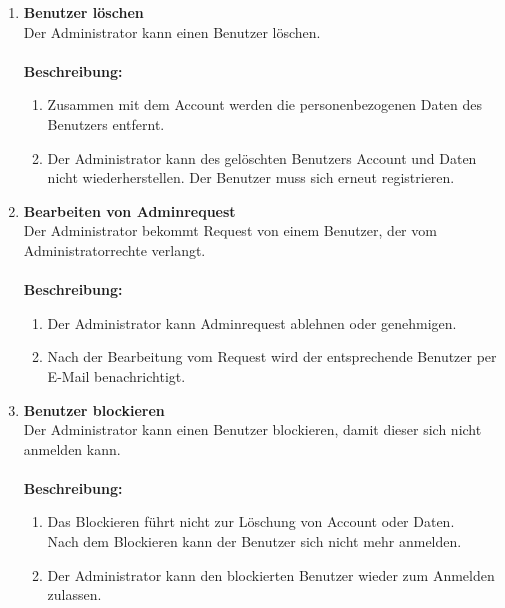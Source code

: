 \documentclass[parskip=full,11pt]{scrartcl}
\def\threedigits#1{%
  \ifnum#1<10 0\fi
  \ifnum#1<1 0\fi
  \number#1}
\begin{document}
\begin{enumerate}[label={\textbf{/F\protect\threedigits{\theenumi}0/}}, leftmargin=*, resume]
\item \label{FAA4} \textbf{Benutzer löschen}\\ Der Administrator kann einen Benutzer löschen.\\\\
\textbf{Beschreibung:}\\
\begin{enumerate}[label=(\arabic*), leftmargin=*]
	\item Zusammen mit dem Account werden die personenbezogenen Daten des Benutzers entfernt.
	\item Der Administrator kann des gelöschten Benutzers Account und Daten nicht wiederherstellen. Der Benutzer muss sich erneut registrieren.
	\end{enumerate}

\item \label{FAA5} \colorbox{shadecolor} {\textbf{Bearbeiten von Adminrequest}}\\ Der Administrator bekommt Request von einem Benutzer, der vom Administratorrechte verlangt.\\\\
\textbf{Beschreibung:}\\
\begin{enumerate}[label=(\arabic*), leftmargin=*]
	\item Der Administrator kann Adminrequest ablehnen oder genehmigen.
	\item Nach der Bearbeitung vom Request wird der entsprechende Benutzer per E-Mail benachrichtigt.
	\end{enumerate}

\item \label{FAA6} \colorbox{shadecolor} {\textbf{Benutzer blockieren}}\\ Der Administrator kann einen Benutzer blockieren, damit dieser sich nicht anmelden kann.\\\\
\textbf{Beschreibung:}\\
\begin{enumerate}[label=(\arabic*), leftmargin=*]
	\item Das Blockieren führt nicht zur Löschung von Account oder Daten.\\
		Nach dem Blockieren kann der Benutzer sich nicht mehr anmelden.
	\item Der Administrator kann den blockierten Benutzer wieder zum Anmelden zulassen.
	\end{enumerate}
\newpage


\end{enumerate}
\end{document}
